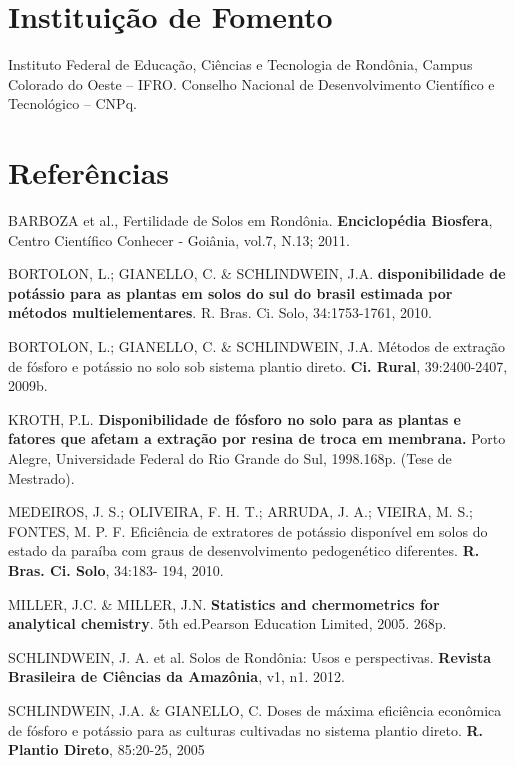 \documentclass[article,12pt,onesidea,4paper,english,brazil]{abntex2}
\begin{document}
	\section*{Instituição de Fomento}
	
	Instituto Federal de Educação, Ciências e Tecnologia de Rondônia, Campus
	Colorado do Oeste – IFRO.
	Conselho Nacional de Desenvolvimento Científico e Tecnológico – CNPq.
	
	\section*{Referências}
	
	\noindent BARBOZA et al., Fertilidade de Solos em Rondônia. \textbf{Enciclopédia Biosfera}, Centro Científico Conhecer - Goiânia, vol.7, N.13; 2011.
	
	\noindent BORTOLON, L.; GIANELLO, C. \& SCHLINDWEIN, J.A. \textbf{disponibilidade de potássio para as plantas em solos do sul do brasil estimada por métodos multielementares}. R. Bras. Ci. Solo, 34:1753-1761, 2010.
	
	\noindent BORTOLON, L.; GIANELLO, C. \& SCHLINDWEIN, J.A. Métodos de extração de fósforo e potássio no solo sob sistema plantio direto. \textbf{Ci. Rural}, 39:2400-2407, 2009b.
	
	\noindent KROTH, P.L. \textbf{Disponibilidade de fósforo no solo para as plantas e fatores que afetam a extração por resina de troca em membrana.} Porto Alegre, Universidade Federal do Rio Grande do Sul, 1998.168p. (Tese de Mestrado).
	
	\noindent MEDEIROS, J. S.; OLIVEIRA, F. H. T.; ARRUDA, J. A.; VIEIRA, M. S.; FONTES, M.
	P. F. Eficiência de extratores de potássio disponível em solos do estado da paraíba com graus de desenvolvimento pedogenético diferentes. \textbf{R. Bras. Ci. Solo}, 34:183- 194, 2010.
	
	\noindent MILLER, J.C. \& MILLER, J.N. \textbf{Statistics and chermometrics for analytical chemistry}. 5th ed.Pearson Education Limited, 2005. 268p.
	
	\noindent SCHLINDWEIN, J. A. et al. Solos de Rondônia: Usos e perspectivas. \textbf{Revista Brasileira de Ciências da Amazônia}, v1, n1. 2012.
	
	\noindent SCHLINDWEIN, J.A. \& GIANELLO, C. Doses de máxima eficiência econômica de fósforo e potássio para as culturas cultivadas no sistema plantio direto. \textbf{R. Plantio Direto}, 85:20-25, 2005
	
\end{document}
